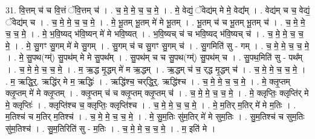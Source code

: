 \documentclass[17pt]{extarticle}
\begin{document}
31. वि॒त्तम् च॑ च वि॒त्तं ॅवि॒त्तम् च॑ । . च॒ मे॒ मे॒ च॒ च॒ मे॒ । . मे॒ वेद्यं॒ ॅवेद्य॑म् मे मे॒ वेद्य᳚म् । . वेद्य॑म् च च॒ वेद्यं॒ ॅवेद्य॑म् च । . च॒ मे॒ मे॒ च॒ च॒ मे॒ । . मे॒ भू॒तम् भू॒तम् मे॑ मे भू॒तम् । . भू॒तम् च॑ च भू॒तम् भू॒तम् च॑ । . च॒ मे॒ मे॒ च॒ च॒ मे॒ । . मे॒ भ॒वि॒ष्यद् भ॑वि॒ष्यन् मे॑ मे भवि॒ष्यत् । . भ॒वि॒ष्यच् च॑ च भवि॒ष्यद् भ॑वि॒ष्यच् च॑ । . च॒ मे॒ मे॒ च॒ च॒ मे॒ । . मे॒ सु॒गꣳ सु॒गम् मे॑ मे सु॒गम् । . सु॒गम् च॑ च सु॒गꣳ सु॒गम् च॑ । . सु॒गमिति॑ सु - गम् । . च॒ मे॒ मे॒ च॒ च॒ मे॒ । . मे॒ सु॒पथ(ग्म्॑) सु॒पथ॑म् मे मे सु॒पथ᳚म् । . सु॒पथ॑म् च च सु॒पथ(ग्म्॑) सु॒पथ॑म् च । . सु॒पथ॒मिति॑ सु - पथ᳚म् । . च॒ मे॒ मे॒ च॒ च॒ मे॒ । . म॒ ऋ॒द्ध मृ॒द्धम् मे॑ म ऋ॒द्धम् । . ऋ॒द्धम् च॑ च॒ र्‌द्ध मृ॒द्धम् च॑ । . च॒ मे॒ मे॒ च॒ च॒ मे॒ । . म॒ ऋद्धि॒र्॒. ऋद्धि॑र् मे म॒ ऋद्धिः॑ । . ऋद्धि॑श्च॒ चर्‌द्धि॒र्॒. ऋद्धि॑श्च । . च॒ मे॒ मे॒ च॒ च॒ मे॒ । . मे॒ क्लृ॒प्तम् क्लृ॒प्तम् मे॑ मे क्लृ॒प्तम् । . क्लृ॒प्तम् च॑ च क्लृ॒प्तम् क्लृ॒प्तम् च॑ । . च॒ मे॒ मे॒ च॒ च॒ मे॒ । . मे॒ क्लृप्तिः॒ क्लृप्ति॑र् मे मे॒ क्लृप्तिः॑ । . क्लृप्ति॑श्च च॒ क्लृप्तिः॒ क्लृप्ति॑श्च । . च॒ मे॒ मे॒ च॒ च॒ मे॒ । . मे॒ म॒तिर् म॒तिर् मे॑ मे म॒तिः । . म॒तिश्च॑ च म॒तिर् म॒तिश्च॑ । . च॒ मे॒ मे॒ च॒ च॒ मे॒ । . मे॒ सु॒म॒तिः सु॑म॒तिर् मे॑ मे सुम॒तिः । . सु॒म॒तिश्च॑ च सुम॒तिः सु॑म॒तिश्च॑ । . सु॒म॒तिरिति॑ सु - म॒तिः । . च॒ मे॒ मे॒ च॒ च॒ मे॒ । . म॒ इति॑ मे । \newline
\end{document}
